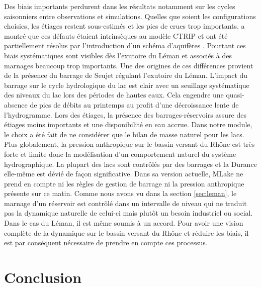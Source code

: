 \noindent Des biais importants perdurent dans les résultats notamment sur les cycles saisonniers entre observations et simulations. Quelles que soient les configurations choisies, les étiages restent sous-estimés et les pics de crues trop importants. \citet{decharme2010} a montré que ces défauts étaient intrinsèques au modèle CTRIP et ont été partiellement résolus par l'introduction d'un schéma d'aquifères \citep{vergnes2012}. Pourtant ces biais systématiques sont visibles dès l'exutoire du Léman et associés à des marnages beaucoup trop importants. Une des origines de ces différences provient de la présence du barrage de Seujet régulant l'exutoire du Léman. L'impact du barrage sur le cycle hydrologique du lac est clair avec un seuillage systématique des niveaux du lac lors des périodes de hautes eaux. Cela engendre une quasi-absence de pics de débits au printemps au profit d'une décroissance lente de l'hydrogramme. Lors des étiages, la présence des barrages-réservoirs assure des étiages moins importants et une disponibilité en eau accrue. Dans notre module, le choix a été fait de ne considérer que le bilan de masse naturel pour les lacs. Plus globalement, la pression anthropique sur le bassin versant du Rhône est très forte et limite donc la modélisation d'un comportement naturel du système hydrographique. La plupart des lacs sont contrôlés par des barrages et la Durance elle-même est dévié de façon significative. Dans sa version actuelle, MLake ne prend en compte ni les règles de gestion de barrage ni la pression anthropique présente sur ce matin. Comme nous avons vu dans la section \ref{sec:leman}, le marnage d'un réservoir est contrôlé dans un intervalle de niveau qui ne traduit pas la dynamique naturelle de celui-ci mais plutôt un besoin industriel ou social. Dans le cas du Léman, il est même soumis à un accord. Pour avoir une vision complète de la dynamique sur le bassin versant du Rhône et réduire les biais, il est par conséquent nécessaire de prendre en compte ces processus.
\clearpage

\section{{\selectfont Conclusion}}

